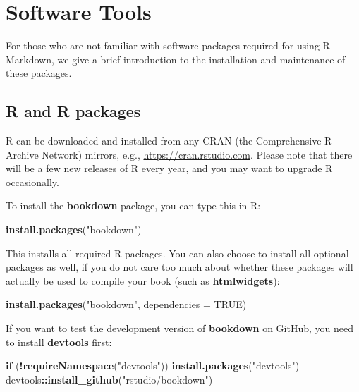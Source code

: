 \documentclass[
  12pt,
]{book}
\newenvironment{Shaded}{\begin{snugshade}}{\end{snugshade}}
\newcommand{\ControlFlowTok}[1]{\textcolor[rgb]{0.13,0.29,0.53}{\textbf{#1}}}
\newcommand{\DataTypeTok}[1]{\textcolor[rgb]{0.13,0.29,0.53}{#1}}
\newcommand{\KeywordTok}[1]{\textcolor[rgb]{0.13,0.29,0.53}{\textbf{#1}}}
\newcommand{\NormalTok}[1]{#1}
\newcommand{\OperatorTok}[1]{\textcolor[rgb]{0.81,0.36,0.00}{\textbf{#1}}}
\newcommand{\OtherTok}[1]{\textcolor[rgb]{0.56,0.35,0.01}{#1}}
\newcommand{\StringTok}[1]{\textcolor[rgb]{0.31,0.60,0.02}{#1}}
\begin{document}
\cleardoublepage

\hypertarget{appendix-appendix}{%
\appendix {}}


\hypertarget{software-tools}{%
\chapter{Software Tools}\label{software-tools}}

For those who are not familiar with software packages required for using R Markdown, we give a brief introduction to the installation and maintenance of these packages.

\hypertarget{r-and-r-packages}{%
\section{R and R packages}\label{r-and-r-packages}}

R can be downloaded and installed from any CRAN (the Comprehensive R Archive Network) mirrors, e.g., \url{https://cran.rstudio.com}. Please note that there will be a few new releases of R every year, and you may want to upgrade R occasionally.

To install the \textbf{bookdown} package, you can type this in R:

\begin{Shaded}
\begin{Highlighting}[]
\KeywordTok{install.packages}\NormalTok{(}\StringTok{"bookdown"}\NormalTok{)}
\end{Highlighting}
\end{Shaded}

This installs all required R packages. You can also choose to install all optional packages as well, if you do not care too much about whether these packages will actually be used to compile your book (such as \textbf{htmlwidgets}):

\begin{Shaded}
\begin{Highlighting}[]
\KeywordTok{install.packages}\NormalTok{(}\StringTok{"bookdown"}\NormalTok{, }\DataTypeTok{dependencies =} \OtherTok{TRUE}\NormalTok{)}
\end{Highlighting}
\end{Shaded}

If you want to test the development version of \textbf{bookdown} on GitHub, you need to install \textbf{devtools} first:

\begin{Shaded}
\begin{Highlighting}[]
\ControlFlowTok{if}\NormalTok{ (}\OperatorTok{!}\KeywordTok{requireNamespace}\NormalTok{(}\StringTok{"devtools"}\NormalTok{)) }\KeywordTok{install.packages}\NormalTok{(}\StringTok{"devtools"}\NormalTok{)}
\NormalTok{devtools}\OperatorTok{::}\KeywordTok{install\_github}\NormalTok{(}\StringTok{"rstudio/bookdown"}\NormalTok{)}
\end{Highlighting}
\end{Shaded}
\end{document}
